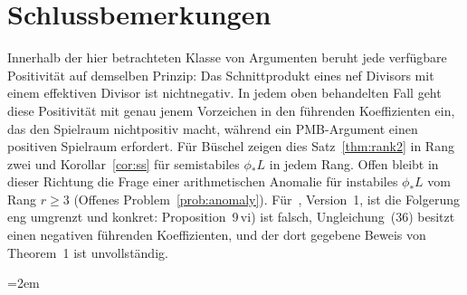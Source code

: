 \documentclass[11pt]{article}
\theoremstyle{definition}
\theoremstyle{remark}
\begin{document}
\section{Schlussbemerkungen}\label{sec:conclusion}

Innerhalb der hier betrachteten Klasse von Argumenten beruht jede verfügbare
Positivität auf demselben Prinzip: Das Schnittprodukt eines nef Divisors mit
einem effektiven Divisor ist nichtnegativ. In jedem oben behandelten Fall geht
diese Positivität mit genau jenem Vorzeichen in den führenden Koeffizienten ein,
das den Spielraum nichtpositiv macht, während ein PMB-Argument einen positiven
Spielraum erfordert. Für Büschel zeigen dies Satz~\ref{thm:rank2} in Rang zwei
und Korollar~\ref{cor:ss} für semistabiles $\phi_*L$ in jedem Rang. Offen bleibt
in dieser Richtung die Frage einer arithmetischen Anomalie für instabiles
$\phi_*L$ vom Rang $r\ge 3$ (Offenes Problem~\ref{prob:anomaly}). Für~\cite{So26},
Version~1, ist die Folgerung eng umgrenzt und konkret: Proposition~9\,vi) ist
falsch, Ungleichung~(36) besitzt einen negativen führenden Koeffizienten, und der
dort gegebene Beweis von Theorem~1 ist unvollständig.

{}
\begingroup
\sloppy\emergencystretch=2em

\endgroup
\end{document}
